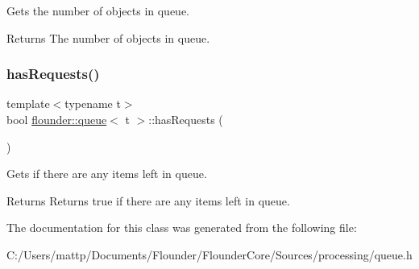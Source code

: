 Gets the number of objects in queue. 

\begin{DoxyReturn}{Returns}
The number of objects in queue. 
\end{DoxyReturn}
\mbox{\label{classflounder_1_1queue_adab970a13d2ff675a64848c99d2ba12a}} 
\subsubsection{\texorpdfstring{has\+Requests()}{hasRequests()}}
{\footnotesize\ttfamily template$<$typename t$>$ \\
bool \hyperlink{classflounder_1_1queue}{flounder\+::queue}$<$ t $>$\+::has\+Requests (\begin{DoxyParamCaption}{ }\end{DoxyParamCaption})\hspace{0.3cm}{\ttfamily [inline]}}



Gets if there are any items left in queue. 

\begin{DoxyReturn}{Returns}
Returns true if there are any items left in queue. 
\end{DoxyReturn}


The documentation for this class was generated from the following file\+:\begin{DoxyCompactItemize}
\item 
C\+:/\+Users/mattp/\+Documents/\+Flounder/\+Flounder\+Core/\+Sources/processing/queue.\+h\end{DoxyCompactItemize}
